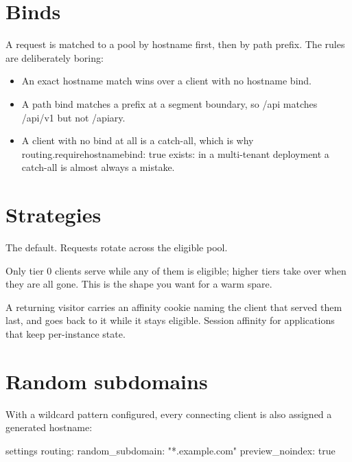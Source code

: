 \documentclass[11pt,a4paper,oneside]{book}
\newcommand{\aperiobreakableunderscore}{\textunderscore\allowbreak}
\newcommand{\aperiocodebreaks}{\XeTeXinterchartokenstate=1 }
\newcommand{\aperiocodebreaks}{}
\DeclareRobustCommand{\code}[1]{{\ttfamily\small\aperiocodebreaks
  \let\_\aperiobreakableunderscore#1}}
\begin{document}
\section{Binds}

A request is matched to a pool by hostname first, then by path prefix.
The rules are deliberately boring:

\begin{itemize}[leftmargin=1.3em]
  \item An exact hostname match wins over a client with no hostname bind.
  \item A path bind matches a prefix at a segment boundary, so
        \code{/api} matches \code{/api/v1} but not \code{/apiary}.
  \item A client with no bind at all is a catch-all, which is why
        \code{routing.require\_hostname\_bind: true} exists: in a
        multi-tenant deployment a catch-all is almost always a mistake.
\end{itemize}

\section{Strategies}

\begin{description}[leftmargin=1.6em,style=nextline]
  \item[\code{round-robin}] The default. Requests rotate across the
        eligible pool.
  \item[\code{primary-standby}] Only tier \code{0} clients serve while any
        of them is eligible; higher tiers take over when they are all
        gone. This is the shape you want for a warm spare.
  \item[\code{sticky}] A returning visitor carries an affinity cookie
        naming the client that served them last, and goes back to it while
        it stays eligible. Session affinity for applications that keep
        per-instance state.
\end{description}

\section{Random subdomains}

With a wildcard pattern configured, every connecting client is also
assigned a generated hostname:

\begin{codecard}[aperioyaml]{settings}
routing:
  random_subdomain: "*.example.com"
  preview_noindex: true
\end{codecard}
\end{document}
